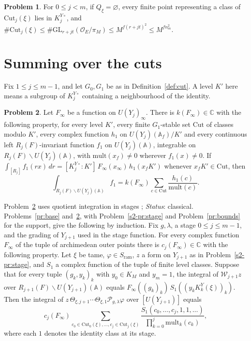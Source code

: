 \documentclass[reqno]{amsart}
\theoremstyle{definition}
\newtheorem{problem}{Problem}[section]
\theoremstyle{plain}
\theoremstyle{remark}
\newcommand{\C}{\mathbb{C}}
\newcommand{\A}{\mathbb{A}}
\newcommand{\Af}{\mathbb{A}_f}
\newcommand{\Oc}{\mathcal{O}}
\newcommand{\Pc}{\mathcal{P}}
\newcommand{\Wc}{\mathcal{W}}
\newcommand{\Cut}{\mathrm{Cut}}
\newcommand{\mult}{\mathrm{mult}}
\newcommand{\Sr}{S_{\mathrm{ram}}}
\newcommand{\KYo}[1]{K^{Y\circ}_{#1}}
\newcommand{\KY}[1]{K^{Y}_{#1}(\xi)}
\begin{document}
\begin{problem}\label{pr:cut-count}
For \(0\le j<m\), if \(Q_\xi=\varnothing\), every finite point representing a class of \(\Cut_j(\xi)\) lies in \(\KYo j\), and \(\#\Cut_j(\xi)\le\#\mathrm{GL}_{r+jt}(\Oc_E/\pi_M)\le M^{f(r+jt)^2}\le M^{fn_m^2}\).
\end{problem}


\section{Summing over the cuts}\label{sec:sum}

Fix \(1\le j\le m-1\), and let \(G_0,G_1\) be as in Definition~\ref{def:cut}.  A level \(K'\) here means a subgroup of \(\KYo j\) containing a neighbourhood of the identity.

\begin{problem}\label{pr:remove}
Let \(F_\infty\) be a function on \(U(Y_j)_\infty\).  There is \(k(F_\infty)\in\C\) with the following property, for every level \(K'\), every finite \(G_1\)-stable set \(\Cut\) of classes modulo \(K'\), every complex function \(h_1\) on \(U(Y_j)(\Af)/K'\) and every continuous left \(R_j(F)\)-invariant function \(f_1\) on \(U(Y_j)(\A)\), integrable on \(R_j(F)\backslash U(Y_j)(\A)\), with \(\mult(x_f)\ne0\) wherever \(f_1(x)\ne0\).  If \(\int_{[R_j]}f_1(rx)\,dr=[\KYo j:K']\,F_\infty(x_\infty)\,h_1(x_fK')\) whenever \(x_fK'\in\Cut\), then
\[
  \int_{R_j(F)\backslash U(Y_j)(\A)}f_1=k(F_\infty)\sum_{c\in\Cut}\frac{h_1(c)}{\mult(c)} .
\]
\end{problem}

Problem~\ref{pr:remove} uses quotient integration in stages \cite[Ch.~VII, \S2]{Bou}; \emph{Status}: classical.  Problems~\ref{pr:base} and~\ref{pr:remove}, with Problem~\ref{s2-pr:stage} and Problem~\ref{pr:bounds} for the support, give the following by induction.  Fix \(g,\lambda\), a stage \(0\le j\le m-1\), and the grading of \(Y_{j+1}\) used in the stage function.  For every complex function \(F_\infty\) of the tuple of archimedean outer points there is \(c_j(F_\infty)\in\C\) with the following property.  Let \(\xi\) be tame, \(\varphi\in\Sr\), \(z\) a form on \(Y_{j+1}\) as in Problem~\ref{s2-pr:stage}, and \(S_1\) a complex function of the tuple of finite level classes.  Suppose that for every tuple \((g_k,y_k)_k\) with \(y_0\in K_M\) and \(y_m=1\), the integral of \(\Wc_{j+1}z\) over \(R_{j+1}(F)\backslash U(Y_{j+1})(\A)\) equals \(F_\infty((g_k)_k)\,S_1((y_k\KY k)_k)\).  Then the integral of \(z\,\Theta_{\xi,j+1}\cdots\Theta_{\xi,1}\Pc_{g,\lambda}\varphi\) over \([U(Y_{j+1})]\) equals
\[
  c_j(F_\infty)\sum_{c_0\in\Cut_0(\xi),\dots,c_j\in\Cut_j(\xi)}\frac{S_1(c_0,\dots,c_j,1,1,\dots)}{\prod_{k=0}^j\mult_k(c_k)} ,
\]
where each \(1\) denotes the identity class at its stage.
\end{document}
